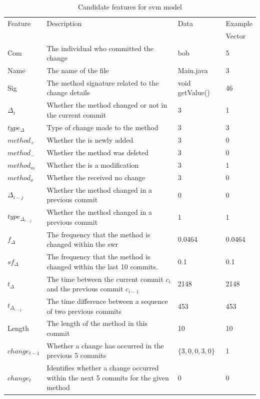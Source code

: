 \begin{table}
\begin{center}
    \begin{tabularx}{\linewidth}{|l|X|l|l|}
        \hline
        Feature & Description & Data & Example \\
         & & & Vector \\
        \hline
        Com & The individual who committed the change & bob & 5 \\ \hline
        Name & The name of the file & Main.java & 3 \\ \hline
        Sig & The method signature related to the change details & void getValue() & 46\\ \hline
        $\Delta_i$ & Whether the method changed or not in the current commit & 3 & 1 \\ \hline 

        $type_{\Delta}$ & Type of change made to the method & 3 & 3 \\ \hline
        $method_+$ & Whether the is newly added & 3 & 0 \\ \hline
        $method_-$ & Whether the method was deleted & 3 & 0 \\ \hline
        $method_m$ & Whether the is a modification & 3 & 1 \\ \hline
        $method_x$ & Whether the received no change & 3 & 0 \\ \hline

        $\Delta_{i-j}$ & Whether the method changed in a previous commit & 0 & 0 \\ \hline

        $type_{\Delta_{i-j}}$ & Whether the method changed in a previous commit & 1 & 1 \\ \hline
        
        $f_{\Delta}$ & The frequency that the method is changed within the \gls{swr} & 0.0464 & 0.0464 \\ \hline
        $sf_{\Delta}$ & The frequency that the method is changed within the last 10 commits.  & 0.1 & 0.1 \\ \hline
        $t_\Delta$ & The time between the current commit $c_i$ and the previous commit $c_{i-1}$ & 2148 & 2148 \\ \hline

        $t_{\Delta_{i-j}}$ & The time difference between a sequence of two previous commits & 453 & 453 \\ \hline

        Length & The length of the method in this commit & 10 & 10 \\ \hline
        $change_{t-1}$ & Whether a change has occurred in the previous 5 commits & $\{3, 0, 0, 3, 0\}$ & 1 \\
        \hline
        $change_{t}$ & Identifies whether a change occurred within the next 5 commits for the given method & 0 & 0\\
        \hline
    \end{tabularx}
\end{center}
    \caption{Candidate features for \gls{svm} model}
    \label{tab:candidate_features}
\end{table}

